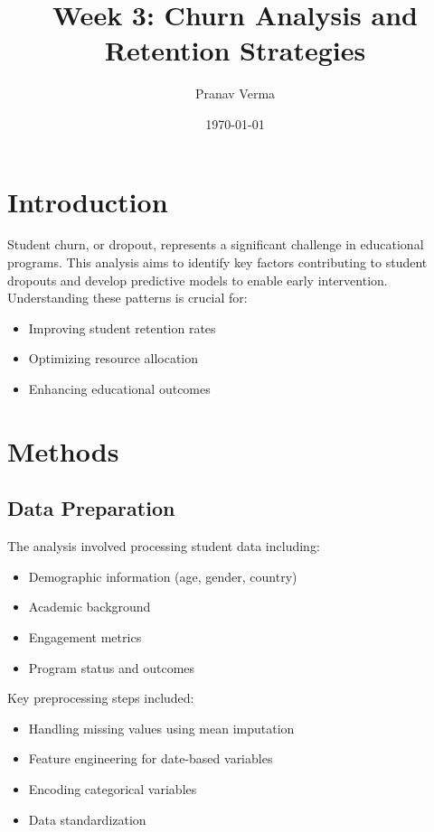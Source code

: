\documentclass[12pt,a4paper]{article}
\title{Week 3: Churn Analysis and Retention Strategies}
\author{Pranav Verma}
\date{\today}
\begin{document}
\maketitle


\section{Introduction}
Student churn, or dropout, represents a significant challenge in educational programs. This analysis aims to identify key factors contributing to student dropouts and develop predictive models to enable early intervention. Understanding these patterns is crucial for:
\begin{itemize}
    \item Improving student retention rates
    \item Optimizing resource allocation
    \item Enhancing educational outcomes
\end{itemize}

\section{Methods}
\subsection{Data Preparation}
The analysis involved processing student data including:
\begin{itemize}
    \item Demographic information (age, gender, country)
    \item Academic background
    \item Engagement metrics
    \item Program status and outcomes
\end{itemize}

Key preprocessing steps included:
\begin{itemize}
    \item Handling missing values using mean imputation
    \item Feature engineering for date-based variables
    \item Encoding categorical variables
    \item Data standardization
\end{itemize}
\end{document}
